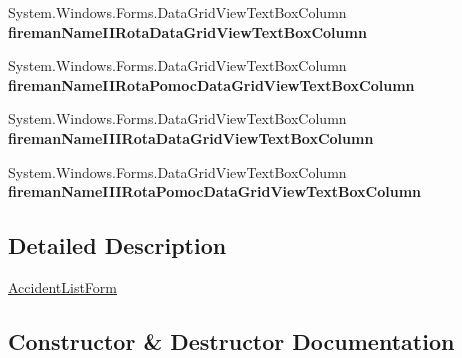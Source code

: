 \begin{DoxyCompactItemize}
\item 
\mbox{\label{class_statystyki___o_s_p_1_1_accident_list_form_a290c986dc1c603a34f4416e1b444f7ac}} 
System.\+Windows.\+Forms.\+Data\+Grid\+View\+Text\+Box\+Column {\bfseries fireman\+Name\+I\+I\+Rota\+Data\+Grid\+View\+Text\+Box\+Column}
\item 
\mbox{\label{class_statystyki___o_s_p_1_1_accident_list_form_ac36c7379b7b43a36f1ab9407933f0ac0}} 
System.\+Windows.\+Forms.\+Data\+Grid\+View\+Text\+Box\+Column {\bfseries fireman\+Name\+I\+I\+Rota\+Pomoc\+Data\+Grid\+View\+Text\+Box\+Column}
\item 
\mbox{\label{class_statystyki___o_s_p_1_1_accident_list_form_a43876fe8aa51cbb7e17f232a2ad22ff2}} 
System.\+Windows.\+Forms.\+Data\+Grid\+View\+Text\+Box\+Column {\bfseries fireman\+Name\+I\+I\+I\+Rota\+Data\+Grid\+View\+Text\+Box\+Column}
\item 
\mbox{\label{class_statystyki___o_s_p_1_1_accident_list_form_a39c7b3a4b989802cf1c78cd021fea819}} 
System.\+Windows.\+Forms.\+Data\+Grid\+View\+Text\+Box\+Column {\bfseries fireman\+Name\+I\+I\+I\+Rota\+Pomoc\+Data\+Grid\+View\+Text\+Box\+Column}
\end{DoxyCompactItemize}


\subsection{Detailed Description}
\mbox{\hyperlink{class_statystyki___o_s_p_1_1_accident_list_form}{Accident\+List\+Form}} 



\subsection{Constructor \& Destructor Documentation}
\mbox{\label{class_statystyki___o_s_p_1_1_accident_list_form_a8b9af2519ba1a5ffde154f51468f38e0}} 

